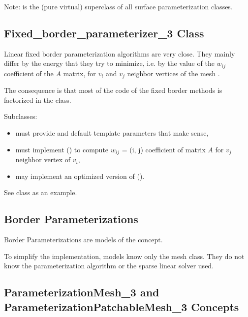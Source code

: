 Note:  is the (pure virtual)
superclass of all surface parameterization classes.


\subsection{Fixed\_border\_parameterizer\_3 Class}

Linear fixed border parameterization algorithms are very close. They mainly
differ by the energy that they try to minimize, i.e. by the value of the $w_{ij}$
coefficient of the $A$ matrix, for $v_i$ and $v_j$ neighbor vertices of the mesh
\cite{cgal:fh-survey-05}.

The consequence is that most of the code of the fixed border methods is factorized in the
 class.

Subclasses:
\begin{itemize}
\item must provide  and 
      default template parameters that make sense,
\item must implement () to compute $w_{ij}$ = (i, j) coefficient
      of matrix $A$ for $v_j$ neighbor vertex of $v_i$,
\item may implement an optimized version of ().
\end{itemize}

See 
class as an example.


\subsection{Border Parameterizations}

Border Parameterizations are models of the  concept.

To simplify the implementation,  models know only the
 mesh class. They do not know the parameterization algorithm
or the sparse linear solver used.


\subsection{ParameterizationMesh\_3 and ParameterizationPatchableMesh\_3 Concepts}


